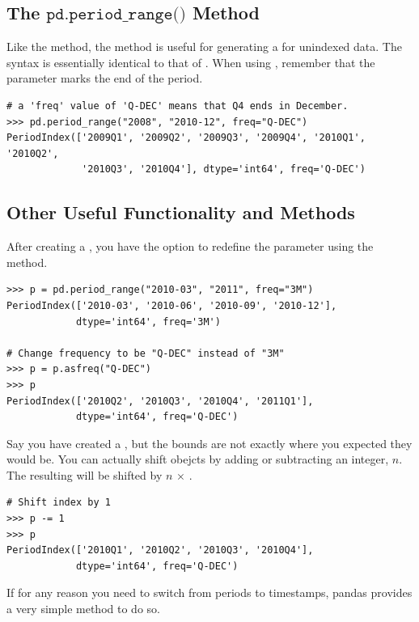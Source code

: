 \subsection*{The $\texttt{pd.period\_range()}$ Method}
Like the  method, the  method is useful for generating a  for unindexed data. The syntax is essentially identical to that of . When using , remember that the  parameter marks the end of the period.

\begin{lstlisting}
# a 'freq' value of 'Q-DEC' means that Q4 ends in December.
>>> pd.period_range("2008", "2010-12", freq="Q-DEC")
PeriodIndex(['2009Q1', '2009Q2', '2009Q3', '2009Q4', '2010Q1', '2010Q2',
             '2010Q3', '2010Q4'], dtype='int64', freq='Q-DEC')
\end{lstlisting}

\subsection*{Other Useful Functionality and Methods}
After creating a , you have the option to redefine the  parameter using the  method.

\begin{lstlisting}
>>> p = pd.period_range("2010-03", "2011", freq="3M")
PeriodIndex(['2010-03', '2010-06', '2010-09', '2010-12'],
            dtype='int64', freq='3M')

# Change frequency to be "Q-DEC" instead of "3M"
>>> p = p.asfreq("Q-DEC")
>>> p
PeriodIndex(['2010Q2', '2010Q3', '2010Q4', '2011Q1'],
            dtype='int64', freq='Q-DEC')
\end{lstlisting}

Say you have created a , but the bounds are not exactly where you expected they would be. You can actually shift  obejcts by adding or subtracting an integer, $n$. The resulting  will be shifted by $n$ $\times$ .

\begin{lstlisting}
# Shift index by 1
>>> p -= 1
>>> p
PeriodIndex(['2010Q1', '2010Q2', '2010Q3', '2010Q4'],
            dtype='int64', freq='Q-DEC')
\end{lstlisting}

If for any reason you need to switch from periods to timestamps, pandas provides a very simple method to do so.

